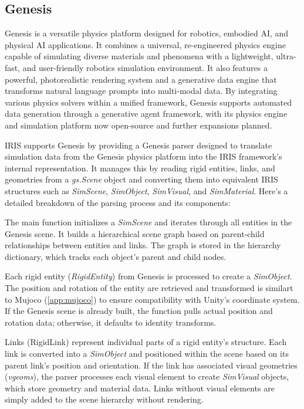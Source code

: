 \subsection{Genesis}

Genesis \cite{Genesis} is a versatile physics platform designed for robotics, embodied AI, and physical AI applications. It combines a universal, re-engineered physics engine capable of simulating diverse materials and phenomena with a lightweight, ultra-fast, and user-friendly robotics simulation environment. It also features a powerful, photorealistic rendering system and a generative data engine that transforms natural language prompts into multi-modal data. By integrating various physics solvers within a unified framework, Genesis supports automated data generation through a generative agent framework, with its physics engine and simulation platform now open-source and further expansions planned.

IRIS supports Genesis by providing a Genesis parser designed to translate simulation data from the Genesis physics platform into the IRIS framework's internal representation.
It manages this by reading rigid entities, links, and geometries from a \textit{gs.Scene} object and converting them into equivalent IRIS structures such as \textit{SimScene}, \textit{SimObject}, \textit{SimVisual}, and \textit{SimMaterial}. Here's a detailed breakdown of the parsing process and its components:

The main function initializes a \textit{SimScene} and iterates through all entities in the Genesis scene.
It builds a hierarchical scene graph based on parent-child relationships between entities and links. The graph is stored in the hierarchy dictionary, which tracks each object's parent and child nodes.

Each rigid entity (\textit{RigidEntity}) from Genesis is processed to create a \textit{SimObject}. The position and rotation of the entity are retrieved and transformed is similart to Mujoco (\ref{app:mujoco}) to ensure compatibility with Unity's coordinate system.
If the Genesis scene is already built, the function pulls actual position and rotation data; otherwise, it defaults to identity transforms.

Links (RigidLink) represent individual parts of a rigid entity's structure. Each link is converted into a \textit{SimObject} and positioned within the scene based on its parent link's position and orientation.
If the link has associated visual geometries (\textit{vgeoms}), the parser processes each visual element to create \textit{SimVisual} objects, which store geometry and material data. Links without visual elements are simply added to the scene hierarchy without rendering.

